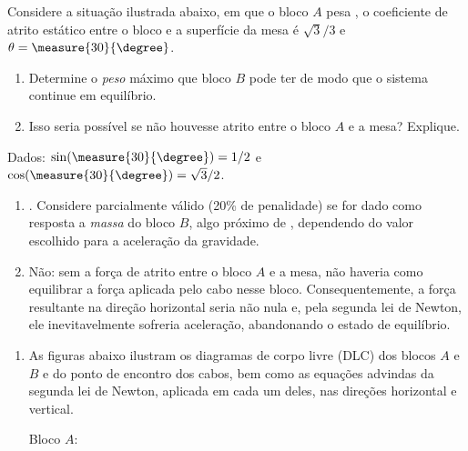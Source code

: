 \begin{question}
	Considere a situação ilustrada abaixo, em que o bloco $A$ pesa , o coeficiente de atrito estático entre o bloco e a superfície da mesa é $\sqrt{3}/3$ e $\theta = \measure{30}{\degree}$.


	\begin{enumerate}
		\item Determine o \emph{peso} máximo que bloco $B$ pode ter de modo que o sistema continue em equilíbrio.
		\item Isso seria possível se não houvesse atrito entre o bloco $A$ e a mesa?
		Explique.
	\end{enumerate}

	\begin{compactdesc}
		\item[Dados:] $\sin(\measure{30}{\degree}) = 1/2$ e $\cos(\measure{30}{\degree}) = \sqrt{3}/2$.
	\end{compactdesc}

	\begin{answer}
		\begin{enumerate}
			\item {}.
			Considere parcialmente válido (20\% de penalidade) se for dado como resposta a \emph{massa} do bloco $B$, algo próximo de , dependendo do valor escolhido para a aceleração da gravidade.
			\item Não: sem a força de atrito entre o bloco $A$ e a mesa, não haveria como equilibrar a força aplicada pelo cabo nesse bloco.
			Consequentemente, a força resultante na direção horizontal seria não nula e, pela segunda lei de Newton, ele inevitavelmente sofreria aceleração, abandonando o estado de equilíbrio.
		\end{enumerate}
	\end{answer}

	\begin{solution}
		\begin{enumerate}
			\item As figuras abaixo ilustram os diagramas de corpo livre (DLC) dos blocos $A$ e $B$ e do ponto de encontro dos cabos, bem como as equações advindas da segunda lei de Newton, aplicada em cada um deles, nas direções horizontal e vertical.

			\bigskip

			\begin{minipage}[t]{0.3\textwidth}
				\noindent
				Bloco $A$:


\end{minipage}
\end{enumerate}
\end{solution}
\end{question}
